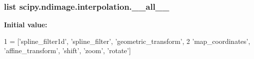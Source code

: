 \subsubsection[{\+\_\+\+\_\+all\+\_\+\+\_\+}]{\setlength{\rightskip}{0pt plus 5cm}list scipy.\+ndimage.\+interpolation.\+\_\+\+\_\+all\+\_\+\+\_\+}\label{namespacescipy_1_1ndimage_1_1interpolation_acecf910ae21d689b5db25e9832428764}
{\bfseries Initial value\+:}
\begin{DoxyCode}
1 = [\textcolor{stringliteral}{'spline\_filter1d'}, \textcolor{stringliteral}{'spline\_filter'}, \textcolor{stringliteral}{'geometric\_transform'},
2            \textcolor{stringliteral}{'map\_coordinates'}, \textcolor{stringliteral}{'affine\_transform'}, \textcolor{stringliteral}{'shift'}, \textcolor{stringliteral}{'zoom'}, \textcolor{stringliteral}{'rotate'}]
\end{DoxyCode}
